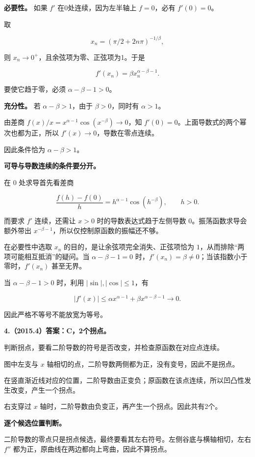 \documentclass[UTF8,11pt,fontset=windows]{ctexart}
\begin{document}
\textbf{必要性。} 如果 $f'$ 在0处连续，因为左半轴上 $f=0$，必有 $f'(0)=0$。

取

$$
x_n=(\pi/2+2n\pi)^{-1/\beta},
$$

则 $x_n\to0^+$，且余弦项为零、正弦项为1。于是

$$
f'(x_n)=\beta x_n^{\alpha-\beta-1}.
$$

要使它趋于零，必须 $\alpha-\beta-1>0$。

\textbf{充分性。} 若 $\alpha-\beta>1$，由于 $\beta>0$，同时有 $\alpha>1$。

由差商 $f(x)/x=x^{\alpha-1}\cos(x^{-\beta})\to0$，知 $f'(0)=0$。上面导数式的两个幂次也都为正，所以 $f'(x)\to0$，导数在零点连续。

因此条件恰为 $\alpha-\beta>1$。

\textbf{可导与导数连续的条件要分开。}

在 $0$ 处求导首先看差商

$$
\frac{f(h)-f(0)}h=h^{\alpha-1}\cos(h^{-\beta}),\qquad h>0.
$$

而要求 $f'$ 连续，还需让 $x>0$ 时的导数表达式趋于左侧导数 $0$。振荡函数求导会额外带出 $x^{-\beta-1}$，所以仅控制原函数的振幅还不够。

在必要性中选取 $x_n$ 的目的，是让余弦项完全消失、正弦项恰为 $1$，从而排除“两项可能相互抵消”的疑问。当 $\alpha-\beta-1=0$ 时，$f'(x_n)=\beta\ne0$；当该指数小于零时，$f'(x_n)$ 甚至无界。

当 $\alpha-\beta-1>0$ 时，利用 $|\sin|,|\cos|\le1$，有

$$
|f'(x)|\le\alpha x^{\alpha-1}+\beta x^{\alpha-\beta-1}\longrightarrow0.
$$

因此严格不等号不能放宽为等号。

\clearpage

\textbf{4.（2015.4）答案：C，2个拐点。}

判断拐点，要看二阶导数的符号是否改变，并检查原函数在对应点连续。

图中左支与 $x$ 轴相切的点，二阶导数两侧都为正，没有变号，因此不是拐点。

在竖直渐近线对应的位置，二阶导数由正变负；原函数在该点连续，所以凹凸性发生改变，产生一个拐点。

右支穿过 $x$ 轴时，二阶导数由负变正，再产生一个拐点。因此共有2个。

\textbf{逐个候选位置判断。}

二阶导数的零点只是拐点候选，最终要看其左右符号。左侧谷底与横轴相切，左右 $f''$ 都为正，原曲线在两边都向上弯曲，因此不算拐点。
\end{document}
